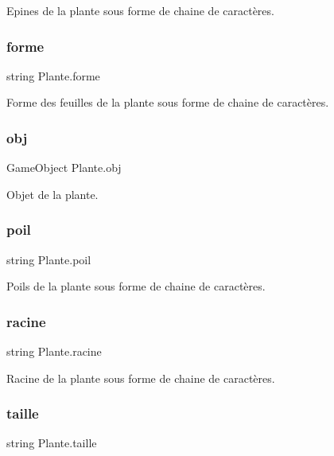 Epines de la plante sous forme de chaine de caractères. \mbox{\label{class_plante_aeab55bfbb7b0aacf9348d63acb955c6a}} 
\subsubsection{\texorpdfstring{forme}{forme}}
{\footnotesize\ttfamily string Plante.\+forme}

Forme des feuilles de la plante sous forme de chaine de caractères. \mbox{\label{class_plante_a9652c0e9525d969b74a871bf3c3f220b}} 
\subsubsection{\texorpdfstring{obj}{obj}}
{\footnotesize\ttfamily Game\+Object Plante.\+obj}

Objet de la plante. \mbox{\label{class_plante_a504f4c475829bc77cc9cae5dd52981da}} 
\subsubsection{\texorpdfstring{poil}{poil}}
{\footnotesize\ttfamily string Plante.\+poil}

Poils de la plante sous forme de chaine de caractères. \mbox{\label{class_plante_a045a93b6b43ac35b8f34a86d791f07c2}} 
\subsubsection{\texorpdfstring{racine}{racine}}
{\footnotesize\ttfamily string Plante.\+racine}

Racine de la plante sous forme de chaine de caractères. \mbox{\label{class_plante_a0de900c1e4a2bbe53c90e6f06ce5bde7}} 
\subsubsection{\texorpdfstring{taille}{taille}}
{\footnotesize\ttfamily string Plante.\+taille}

